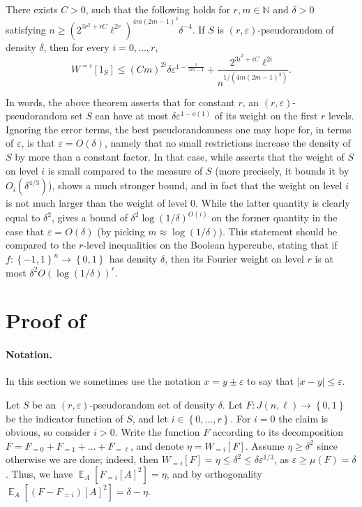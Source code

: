 \documentclass{toc}
\newcommand\card[1]{\left| {#1} \right|}
\newcommand\set[1]{{\left\{ #1 \right\}}}
\newcommand\Expect[2]{{\mathop{\mathbb{E}}_{#1}\left[ {#2} \right]}}
\newcommand\power[1]{\set{0,1}^{#1}}
\newcommand\cube[1]{ { \set{-1,1}^{#1} } }
\newcommand\eps{\varepsilon}
\renewcommand\geq{\geqslant}
\renewcommand\leq{\leqslant}
\newcommand\lvlfn[2]{{#1}_{={#2}}}
\begin{document}
\begin{theorem}\label{thm:main3}
There exists $C>0$, such that the following holds for $r,m\in\mathbb{N}$ and $\delta>0$ satisfying
$n\geq (2^{3r^2+rC}\ell^{2r})^{4m(2m-1)^2}\delta^{-4}$.
If $S$ is $(r,\eps)$-pseudorandom of density $\delta$, then for every $i=0,\ldots,r$,
\[
W^{=i}[1_S] \leq
(C m)^{2i}\delta\eps^{1-\frac{1}{2m-1}}
+\frac{2^{3i^2+iC}\ell^{2i}}{n^{1/(4m(2m-1)^2)}}.
\]
%
\end{theorem}

In words, the above theorem asserts that for constant $r$, an $(r,\eps)$-pseudorandom set $S$
can have at most $\delta\eps^{1-o(1)}$ of its weight on the first $r$ levels. Ignoring the error terms,
the best pseudorandomness one may hope for, in terms of $\eps$, is that $\eps = O(\delta)$, namely that
no small restrictions increase the density of $S$ by more than a constant factor. In that case, while 
asserts that the weight of $S$ on level $i$ is small compared to the measure of $S$ (more precisely, it bounds it by
$O_i(\delta^{4/3})$),  shows a much stronger bound, and in fact that the weight on level $i$
is not much larger than the weight of level $0$.
While the latter quantity is clearly equal to $\delta^2$,  gives a bound of $\delta^2 \log(1/\delta)^{O(i)}$
on the former quantity in the case that $\eps = O(\delta)$ (by picking $m \approx \log(1/\delta)$). %
%
%
%
This statement should be compared to the $r$-level inequalities on the Boolean hypercube, stating that if
$f\colon \cube{n}\to\power{}$ has density $\delta$, then its Fourier weight on level $r$ is at most $\delta^2O(\log(1/\delta))^r$.
%



\section{Proof of }\label{section:main_pf}
\paragraph{Notation.} In this section we sometimes use the notation $x=y\pm \eps$ to say that $\card{x-y}\leq \eps$.


Let $S$ be an $(r,\eps)$-pseudorandom set of density $\delta$.
Let $F\colon J(n,\ell)\to\power{}$ be the indicator function of $S$, and let $i\in\set{0,...,r}$.
For $i=0$ the claim is obvious, so consider $i>0$.
Write the function $F$ according to its decomposition $F=\lvlfn{F}{0}+\lvlfn{F}{1}+\ldots+\lvlfn{F}{\ell}$, and denote
$\eta = W_{=i}[F]$. Assume $\eta\geq \delta^2$ since otherwise we are done; indeed, then
$W_{=i}[F] = \eta \leq \delta^2\leq \delta \eps^{1/3}$, as $\eps\geq \mu(F) = \delta$.
Thus, we have $\Expect{A}{\lvlfn{F}{i}[A]^2} = \eta$, and by orthogonality $\Expect{A}{(F-\lvlfn{F}{i})[A]^2}=\delta-\eta$.
%
%
%
%
\end{document}
